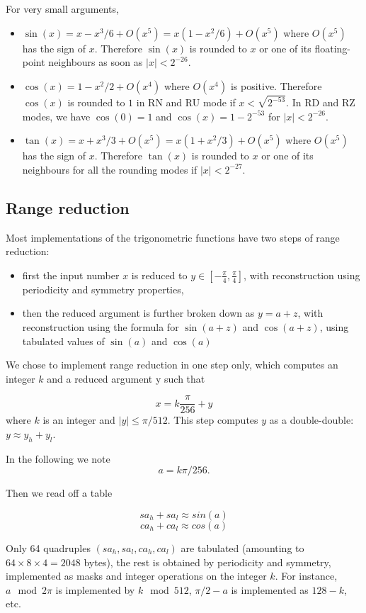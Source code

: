 For very small arguments,
\begin{itemize}
\item $\sin(x) = x-x^3/6 + O(x^5) = x(1-x^2/6) + O(x^5)$ where
  $O(x^5)$ has the sign of $x$. Therefore $\sin(x)$ is rounded to $x$
  or one of its floating-point neighbours as soon as $|x|<2^{-26}$.
\item $\cos(x) = 1-x^2/2 + O(x^4)$ where $O(x^4)$ is positive.
  Therefore $\cos(x)$ is rounded to $1$ in RN and RU mode if
  $x<\sqrt{2^{-53}}$. In RD and RZ modes, we have $\cos(0)=1$ and
  $\cos(x)=1-2^{-53}$ for $|x|<2^{-26}$.
\item $\tan(x) = x+x^3/3 + O(x^5) = x(1+x^2/3) + O(x^5)$ where
  $O(x^5)$ has the sign of $x$. Therefore $\tan(x)$ is rounded to $x$
  or one of its neighbours for all the rounding  modes if $|x|<2^{-27}$.
\end{itemize}


\subsection{Range reduction}

Most implementations of the trigonometric functions have two steps of range reduction:
\begin{itemize}
\item first the input number $x$ is reduced to $y\in
  [-\frac{\pi}{4}, \frac{\pi}{4}]$, with reconstruction using periodicity and
  symmetry properties,
\item then the reduced argument is further broken down as $y=a+z$,
  with reconstruction using the formula for $\sin(a+z)$ and
  $\cos(a+z)$, using tabulated values of $\sin(a)$ and
  $\cos(a)$
\end{itemize}

We chose to implement range reduction in one step only, which
computes an integer $k$ and a reduced argument y such that

\begin{equation}
  x = k\frac{\pi}{256} + y\label{eq:trigoargred}
\end{equation}
where $k$ is an integer and  $ |y| \leq {\pi}/{512}$.
This step computes $y$ as a double-double: $y\approx y_h+y_l$.

In the following we note $$a=k\pi/256.$$

Then we read off a table

$$sa_h+sa_l \approx sin(a)$$
$$ca_h+ca_l \approx cos(a)$$

Only 64 quadruples $(sa_h,sa_l,ca_h,ca_l)$ are tabulated (amounting to
$64\times 8 \times 4 = 2048$ bytes), the rest is obtained by
periodicity and symmetry, implemented as masks and integer operations
on the integer $k$. For instance,  $a \mod 2\pi$ is implemented by $k \mod 512$,
$\pi/2-a$ is implemented as $128-k$, etc.



